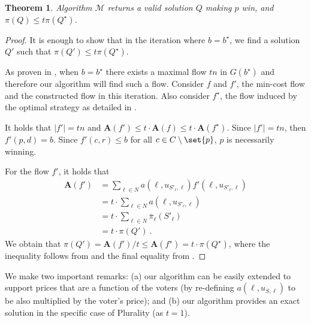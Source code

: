 \documentclass[letterpaper]{article} %
\newtheorem{theorem}{Theorem}
\newcommand{\vecc}{\mathbf}
\newcommand{\Cmp}{C \setminus \set{p}}
\newcommand{\abs}[1]{\lvert{#1}\rvert}
\newcommand{\Aoper}[1]{\vecc{A}({#1})}
\begin{document}
\begin{theorem}
Algorithm $\mathcal{M}$ returns a valid solution $Q$ making $p$ win, and $\pi(Q) \leq t \pi(Q^{\star})$.
\end{theorem}
\begin{proof}
It is enough to show that in the iteration where $b = b^{\star}$, we find a solution  $Q' $ such that $\pi(Q' ) \leq t \pi(Q^{\star})$.

As proven in , when $b = b^{\star}$ there exists a maximal flow $tn$ in $G(b^{\star})$ and therefore our algorithm will find such a flow. Consider $f$ and $f'$, the min-cost flow and the constructed flow in this iteration. Also consider  $f^\star$, the flow induced by the optimal strategy as detailed in .

It holds that $\abs{f'} = tn$ and $\Aoper{f'} \leq t \cdot \Aoper{f} \leq t \cdot \Aoper{f^\star} $. Since $\abs{f'} = tn$, then $f'(p,d)=b$. Since $f'(c,r)\leq b$ for all $c \in \Cmp$, $p$ is necessarily winning.

For the flow $f'$,  it holds that
\begin{align*}
    \Aoper{f'} &= \sum_{\ell \in N}a(\ell, u_{S'_\ell, \ell})f'(\ell, u_{S'_\ell, \ell})\\
    &= t \cdot \sum_{\ell \in N}a(\ell, u_{S'_\ell, \ell})\\
    &=  t \cdot \sum_{\ell \in N}\bar{\pi}_{\ell}(S'_\ell)\\
    &= t\cdot \pi(Q')\ .
\end{align*}
We obtain that $\pi(Q') = \Aoper{f'}/t \leq  \Aoper{f^\star} = t \cdot \pi(Q^\star)$, where the inequality follows from  and the final equality from .
\end{proof}
We make two important remarks: (a) our algorithm can be easily extended to support prices that are a function of the voters (by re-defining $a(\ell, u_{S,\ell})$ to be also multiplied by the voter's price); and (b) our algorithm provides an exact solution in the specific case of Plurality (as $t=1$).
\end{document}
